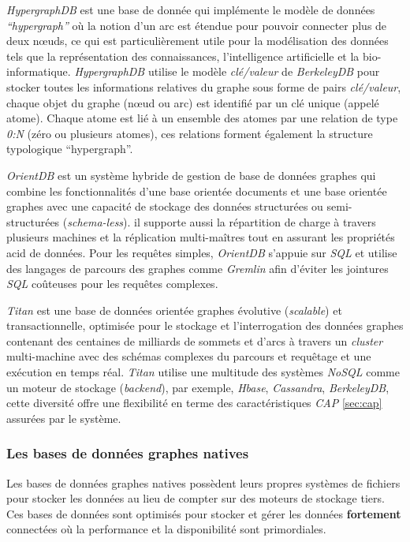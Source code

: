     \emph{HypergraphDB} \cite{hypergraphdb, iordanov2010hypergraphdb}
    est une base de donnée qui implémente le modèle de données
    \emph{``hypergraph''} où la notion d'un arc est étendue pour
    pouvoir connecter plus de deux nœuds, ce qui est particulièrement
    utile pour la modélisation des données tels que la représentation
    des connaissances, l'intelligence artificielle et la
    bio-informatique. \emph{HypergraphDB} utilise le modèle
    \textit{clé/valeur} de \emph{BerkeleyDB} \cite{berkeleydb} pour
    stocker toutes les informations relatives du graphe sous forme de
    pairs \textit{clé/valeur}, chaque objet du graphe (nœud ou arc)
    est identifié par un clé unique (appelé atome). Chaque atome est
    lié à un ensemble des atomes par une relation de type \emph{0:N}
    (zéro ou plusieurs atomes), ces relations forment également la
    structure typologique ``hypergraph''.

    \emph{OrientDB} \cite{orientdb} est un système hybride de gestion
    de base de données graphes qui combine les fonctionnalités d'une
    base orientée documents et une base orientée graphes avec une
    capacité de stockage des données structurées ou semi-structurées
    (\emph{schema-less}). il supporte aussi la répartition de charge à
    travers plusieurs machines et la réplication multi-maîtres tout en
    assurant les propriétés \acrshort{acid} de données. Pour les
    requêtes simples, \emph{OrientDB} s'appuie sur \emph{SQL} et
    utilise des langages de parcours des graphes comme \emph{Gremlin}
    afin d'éviter les jointures \emph{SQL} coûteuses pour les requêtes
    complexes.

    \emph{Titan} \cite{titan} est une base de données orientée graphes
    évolutive (\emph{scalable}) et transactionnelle, optimisée pour le
    stockage et l'interrogation des données graphes contenant des
    centaines de milliards de sommets et d'arcs à travers un
    \emph{cluster} multi-machine avec des schémas complexes du
    parcours et requêtage et une exécution en temps réal. \emph{Titan}
    utilise une multitude des systèmes \emph{NoSQL} comme un moteur de
    stockage (\emph{backend}), par exemple, \emph{Hbase},
    \emph{Cassandra}, \emph{BerkeleyDB}, cette diversité offre une
    flexibilité en terme des caractéristiques \emph{CAP} \ref{sec:cap}
    assurées par le système.

    \subsubsection{Les bases de données graphes natives}
    \label{sec:graphdb-native}
    Les bases de données graphes natives possèdent leurs propres
    systèmes de fichiers pour stocker les données au lieu de compter
    sur des moteurs de stockage tiers. Ces bases de données sont
    optimisés pour stocker et gérer les données \textbf{fortement}
    connectées où la performance et la disponibilité sont
    primordiales.

